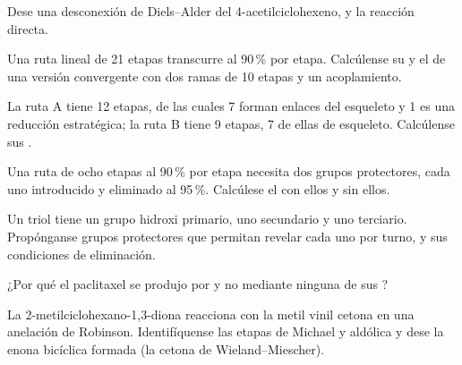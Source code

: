 \begin{exercise}[$\star$]\label{exo:b3:total-synthesis:4}
Dese una desconexión de Diels--Alder del 4-acetilciclohexeno, y la reacción
directa.
\end{exercise}

\begin{exercise}[$\star\star$]\label{exo:b3:total-synthesis:5}
Una ruta lineal de 21 etapas transcurre al 90\,\% por etapa. Calcúlense su  y el
de una versión convergente con dos ramas de 10 etapas y un acoplamiento.
\end{exercise}

\begin{exercise}[$\star\star$]\label{exo:b3:total-synthesis:6}
La ruta A tiene 12 etapas, de las cuales 7 forman enlaces del esqueleto y 1 es una reducción
estratégica; la ruta B tiene 9 etapas, 7 de ellas de esqueleto. Calcúlense sus .
\end{exercise}

\begin{exercise}[$\star\star$]\label{exo:b3:total-synthesis:7}
Una ruta de ocho etapas al 90\,\% por etapa necesita dos grupos protectores, cada uno introducido y
eliminado al 95\,\%. Calcúlese el  con ellos y sin ellos.
\end{exercise}

\begin{exercise}[$\star\star$]\label{exo:b3:total-synthesis:8}
Un triol tiene un grupo hidroxi primario, uno secundario y uno terciario. Propónganse
grupos protectores que permitan revelar cada uno por turno, y sus condiciones de
eliminación.
\end{exercise}

\begin{exercise}[$\star\star$]\label{exo:b3:total-synthesis:9}
¿Por qué el paclitaxel se produjo por  y no mediante ninguna de sus ?
\end{exercise}

\begin{exercise}[$\star\star\star$]\label{exo:b3:total-synthesis:10}
La 2-metilciclohexano-1,3-diona reacciona con la metil vinil cetona en una anelación de
Robinson. Identifíquense las etapas de Michael y aldólica y dese la enona bicíclica
formada (la cetona de Wieland--Miescher).
\end{exercise}

